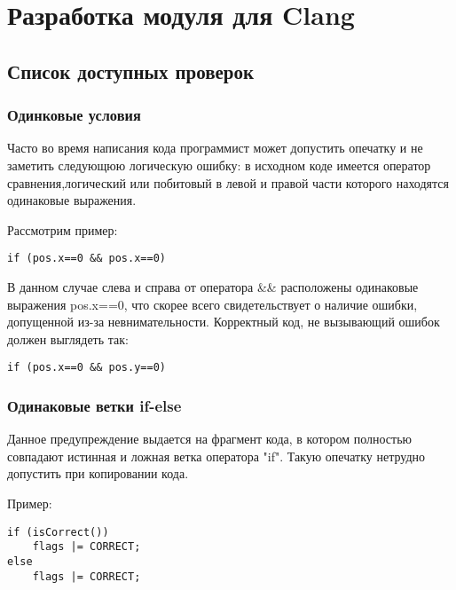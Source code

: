\chapter{Разработка модуля для Clang}

\section{Список доступных проверок}

\subsection{Одинковые условия}
\label{sec:eqBin}
Часто во время написания кода программист может допустить опечатку и не заметить следующюю
логическую ошибку: в исходном коде имеется оператор сравнения,логический или побитовый в левой 
и правой части которого находятся одинаковые выражения. 

Рассмотрим пример:
\begin{lstlisting}
if (pos.x==0 && pos.x==0)
\end{lstlisting}

В данном случае слева и справа от оператора \&\& расположены одинаковые выражения pos.x==0,
что скорее всего свидетельствует о наличие ошибки, допущенной из-за невнимательности. Корректный код,
не вызывающий ошибок должен выглядеть так:
\begin{lstlisting}
if (pos.x==0 && pos.y==0)
\end{lstlisting}

\subsection{Одинаковые ветки if-else}
\label{sec:eqStmt}
Данное предупреждение выдается на фрагмент кода, в котором полностью совпадают истинная и ложная ветка 
оператора "if". Такую опечатку нетрудно допустить при копировании кода.

Пример:
\begin{lstlisting}
if (isCorrect())
	flags |= CORRECT;
else
	flags |= CORRECT;
\end{lstlisting}

